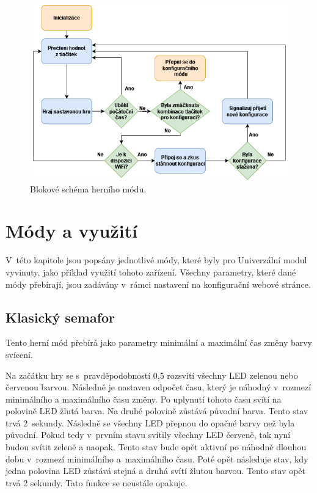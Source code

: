 \begin{figure}[!h]
  \begin{center}
    \includegraphics[scale=0.65]{obrazky/blokove_schema_modu_PLAY.png}
  \end{center}
  \caption[Blokové schéma herního módu]{Blokové schéma herního módu.}
\end{figure}

\chapter{Módy a využití}
V~této kapitole jsou popsány jednotlivé módy, které byly pro Univerzální modul vyvinuty, jako příklad využití tohoto zařízení. Všechny parametry, které dané módy přebírají, jsou zadávány 
v~rámci nastavení na konfigurační webové stránce.

\section{Klasický semafor}
Tento herní mód přebírá jako parametry minimální a maximální čas změny barvy svícení. 

Na začátku hry se s~pravděpodobností 0,5 rozsvítí všechny LED zelenou nebo červenou barvou. Následně je nastaven odpočet času, který je náhodný v~rozmezí minimálního a maximálního času změny. 
Po uplynutí tohoto času svítí na polovině LED žlutá barva. Na druhé polovině zůstává původní barva. Tento stav trvá 2~sekundy. Následně se všechny LED přepnou do opačné barvy než byla původní. 
Pokud tedy v~prvním stavu svítily všechny LED červeně, tak nyní budou svítit zeleně a naopak. Tento stav bude opět aktivní po náhodně dlouhou dobu v~rozmezí minimálního a~maximálního času. Poté 
opět následuje stav, kdy jedna polovina LED zůstává stejná a druhá svítí žlutou barvou. Tento stav opět trvá 2 sekundy. Tato funkce se neustále opakuje. 

